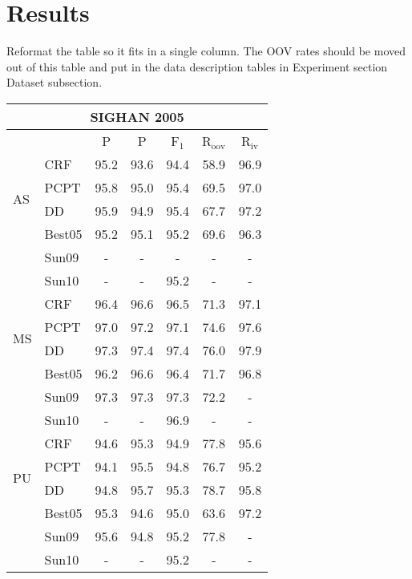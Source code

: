 \section{Results}

Reformat the table so it fits in a single column. 
The OOV rates should be moved out of this table and put in the data description tables in Experiment section Dataset subsection.

\begin{table}
\centering
\begin{small}
\begin{tabular}{ l | l | c | c | c | c | c   }
\multicolumn{7}{c}{\large{SIGHAN 2005}} \\
\hline
    \multicolumn{2}{c}{}  &  \multicolumn{1}{c}{P} &  \multicolumn{1}{c}{P}  & \multicolumn{1}{c}{F$_1$}   &   \multicolumn{1}{c|}{R$_{\mathrm{oov}}$}    &  \multicolumn{1}{c}{R$_{\mathrm{iv}}$}   \\ 
\hline
\multirow{4}{*}{AS} &  CRF                                                        & 95.2 &   93.6 & 94.4  &  58.9 & 96.9 \\
 & PCPT                                       & 95.8 & 95.0 & 95.4  & 69.5 & 97.0 \\ 
& DD                                       & 95.9 & 94.9 & {95.4}  & {67.7} & {97.2} \\
& Best05      & 95.2 &  {95.1} & 95.2 &   69.6 &  96.3 \\
& Sun09      &  -   & -  & -  &  -  & - \\
& Sun10      & -   & -  & 95.2  &   -  & - \\

\hline

\multirow{4}{*}{MS} &  CRF        &  96.4 &   96.6 &  96.5  & 71.3 & 97.1 \\
& PCPT &  97.0 &  97.2 &  97.1  & 74.6 & 97.6 \\
& DD & {97.3} &  {97.4} &  {97.4}  & {76.0} & {97.9} \\
& Best05      & 96.2  & 96.6 &  96.4  &   71.7 &   96.8 \\
& Sun09      & 97.3   & 97.3  & 97.3  &   72.2  & - \\
& Sun10      & -   & -  & 96.9  &   -  & - \\
\hline

\multirow{4}{*}{PU} &   CRF        & 94.6 &	95.3 & 94.9  &   77.8 &  95.6 \\
& PCPT  & 94.1 & 95.5 & 94.8  &  76.7 &  95.2 \\
& DD  & 94.8 & {95.7} & {95.3}  &  {78.7} &95.8 \\
& Best05       & {95.3}  &      94.6 &  95.0   &  63.6 &  {97.2} \\
& Sun09      & 95.6   & 94.8  & 95.2  &   77.8  & - \\
& Sun10      & -   & -  & 95.2  &   -  & - \\
\hline


\end{tabular}
\end{small}
\end{table}

